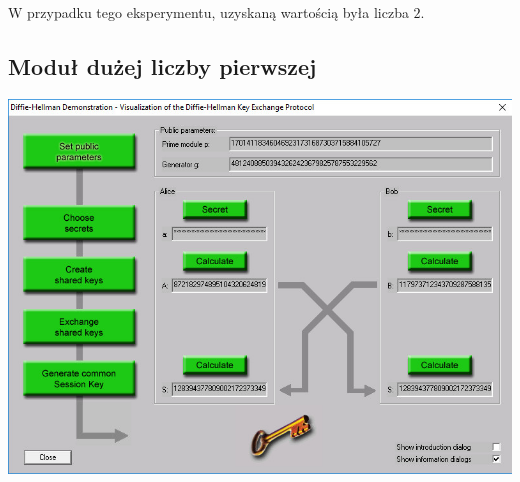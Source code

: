 \documentclass[12pt]{article}
\begin{document}
W przypadku tego eksperymentu, uzyskaną wartością była liczba $2$.

\subsection{Moduł dużej liczby pierwszej}

\begin{center}
	\includegraphics[scale=0.4]{4-cryptool-2}
\end{center}
\end{document}
